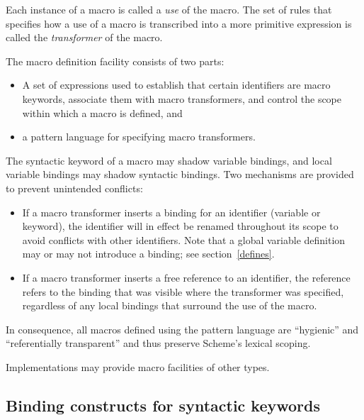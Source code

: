 Each instance of a macro is called a {\em use}
of the macro.
The set of rules that specifies
how a use of a macro is transcribed into a more primitive expression
is called the {\em transformer}
of the macro.

The macro definition facility consists of two parts:

\begin{itemize}
\item A set of expressions used to establish that certain identifiers
are macro keywords, associate them with macro transformers, and control
the scope within which a macro is defined, and

\item a pattern language for specifying macro transformers.
\end{itemize}

The syntactic keyword of a macro may shadow variable bindings, and local
variable bindings may shadow syntactic bindings.    
Two mechanisms are provided to prevent unintended conflicts:

\begin{itemize}

\item If a macro transformer inserts a binding for an identifier
(variable or keyword), the identifier will in effect be renamed
throughout its scope to avoid conflicts with other identifiers.
Note that a global variable definition may or may not introduce a binding;
see section~\ref{defines}.

\item If a macro transformer inserts a free reference to an
identifier, the reference refers to the binding that was visible
where the transformer was specified, regardless of any local
bindings that surround the use of the macro.

\end{itemize}

In consequence, all macros
defined using the pattern language  are ``hygienic'' and ``referentially
transparent'' and thus preserve Scheme's lexical scoping.~\cite{Kohlbecker86,
hygienic,Bawden88,macrosthatwork,syntacticabstraction}

Implementations may provide macro facilities of other types.

\subsection{Binding constructs for syntactic keywords}
\label{bindsyntax}

